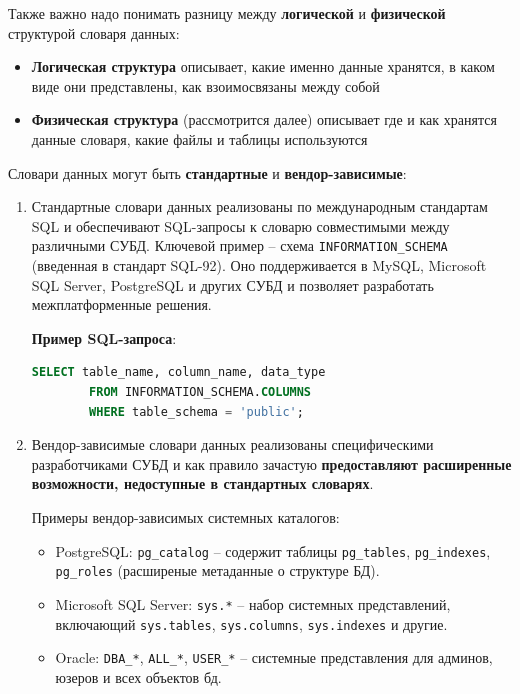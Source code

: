 Также важно надо понимать разницу между \textbf{логической} и \textbf{физической} структурой словаря данных:

\begin{itemize}
    \item \textbf{Логическая структура} описывает, какие именно данные хранятся, в каком виде они представлены, как взоимосвязаны между собой
    \item \textbf{Физическая структура} (рассмотрится далее) описывает где и как хранятся данные словаря, какие файлы и таблицы используются
\end{itemize}

Словари данных могут быть \textbf{стандартные} и \textbf{вендор-зависимые}:

\begin{enumerate}
 
    \item Стандартные словари данных реализованы по международным стандартам SQL и обеспечивают SQL-запросы к словарю совместимыми между различными СУБД. Ключевой пример – схема \texttt{INFORMATION\_SCHEMA} (введенная в стандарт SQL-92). Оно поддерживается в MySQL, Microsoft SQL Server, PostgreSQL и других СУБД и позволяет разработать межплатформенные решения.

        \textbf{Пример SQL-запроса}:
        \begin{lstlisting}[language=SQL]
        SELECT table_name, column_name, data_type 
        FROM INFORMATION_SCHEMA.COLUMNS 
        WHERE table_schema = 'public';
        \end{lstlisting}

    \item Вендор-зависимые словари данных реализованы специфическими разработчиками СУБД и как правило зачастую \textbf{предоставляют расширенные возможности, недоступные в стандартных словарях}. 

    Примеры вендор-зависимых системных каталогов:
    \begin{itemize}
        \item PostgreSQL: \texttt{pg\_catalog} – содержит таблицы \texttt{pg\_tables}, \texttt{pg\_indexes}, \texttt{pg\_roles} (расширеные метаданные о структуре БД).
        \item Microsoft SQL Server: \texttt{sys.*} – набор системных представлений, включающий \texttt{sys.tables}, \texttt{sys.columns}, \texttt{sys.indexes} и другие.
        \item Oracle: \texttt{DBA\_*}, \texttt{ALL\_*}, \texttt{USER\_*} – системные представления для админов, юзеров и всех объектов бд.
    \end{itemize}

\end{enumerate}

